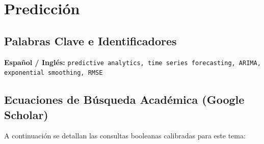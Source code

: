 \section{Predicción}
\label{sec:06_prediccion}


\subsection{Palabras Clave e Identificadores}
\textbf{Español / Inglés:} \texttt{predictive analytics, time series forecasting, ARIMA, exponential smoothing, RMSE}


\subsection{Ecuaciones de Búsqueda Académica (Google Scholar)}
A continuación se detallan las consultas booleanas calibradas para este tema:
